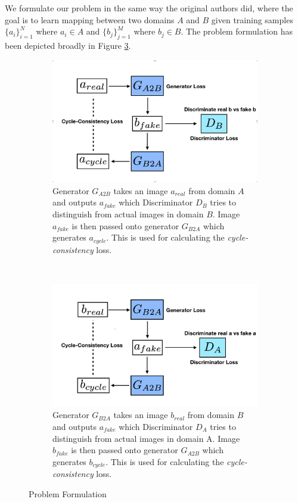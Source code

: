 \documentclass[10pt,twocolumn,letterpaper]{article}
\begin{document}
We formulate our problem in the same way the original authors \cite{cyclegan} did, where the goal is to 
learn mapping between two domains $A$ and $B$ given training samples $\{a_i\}_{i=1}^N$ where $a_i \in 
A$ and $\{b_j\}_{j=1}^M$ where $b_j \in B$. The problem formulation has been depicted broadly in Figure 
\ref{fig:problem}.

\begin{figure}[!htb]
     \centering
     \begin{subfigure}[b]{0.4\textwidth}
         \centering
         \includegraphics[width=\textwidth]{gan_b}
         \caption{Generator $G_{A2B}$ takes an image $a_{real}$ from domain $A$ and outputs $a_{fake}$ which Discriminator $D_B$ tries to distinguish from actual images in domain $B$. Image $a_{fake}$ is then passed onto generator $G_{B2A}$ which generates $a_{cycle}$. This is used for calculating the \textit{cycle-consistency} loss.}
         \label{fig:gan_b}
     \end{subfigure}
     ~
     \begin{subfigure}[b]{0.4\textwidth}
         \centering
         \includegraphics[width=\textwidth]{gan_a}
         \caption{Generator $G_{B2A}$ takes an image $b_{real}$ from domain $B$ and outputs $a_{fake}$ which Discriminator $D_A$ tries to distinguish from actual images in domain A. Image $b_{fake}$ is then passed onto generator $G_{A2B}$ which generates $b_{cycle}$. This is used for calculating the \textit{cycle-consistency} loss.}
         \label{fig:gan_a}
     \end{subfigure}
        \caption{Problem Formulation}
        \label{fig:problem}
\end{figure} 
\end{document}
